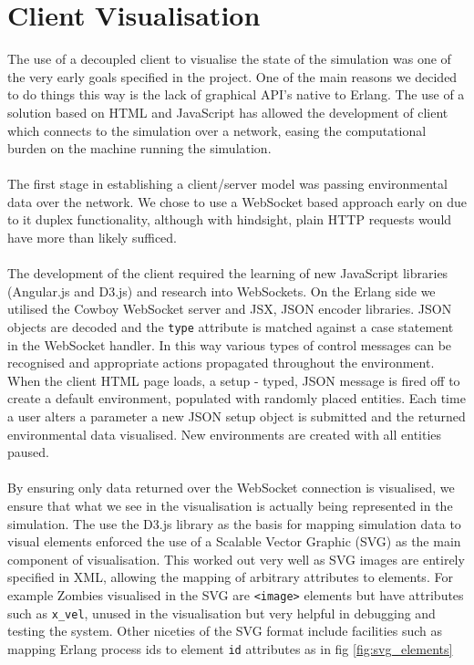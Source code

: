 \documentclass[10pt, a4paper, conference, compsocconf]{IEEEtran}
\begin{document}
\section{Client Visualisation \label{client}}
\label{visualisation}
The use of a decoupled client to visualise the state of the simulation was one of the very early goals specified in the project. One of the main reasons we decided to do things this way is the lack of graphical API's native to Erlang. The use of a solution based on HTML and JavaScript has allowed the development of client which connects to the simulation over a network, easing the computational burden on the machine running the simulation.\\
\\
The first stage in establishing a client/server model was passing environmental data over the network. We chose to use a WebSocket based approach early on due to it duplex functionality, although with hindsight, plain HTTP requests would have more than likely sufficed.\\
\\
The development of the client required the learning of new JavaScript libraries (Angular.js and D3.js) and research into WebSockets. On the Erlang side we utilised the Cowboy WebSocket\cite{cowboy} server and JSX, JSON encoder libraries. JSON objects are decoded and the \verb+type+ attribute is matched against a case statement in the WebSocket handler. In this way various types of control messages can be recognised and appropriate actions propagated throughout the environment. When the client HTML page loads, a setup - typed, JSON message is fired off to create a default environment, populated with randomly placed entities. Each time a user alters a parameter a new JSON setup object is submitted and the returned environmental data visualised. New environments are created with all entities paused.\\
\\
By ensuring only data returned over the WebSocket connection is visualised, we ensure that what we see in the visualisation is actually being represented in the simulation. The use the D3.js library as the basis for mapping simulation data to visual elements enforced the use of a Scalable Vector Graphic (SVG) as the main component of visualisation. This worked out very well as SVG images are entirely specified in XML, allowing the mapping of arbitrary attributes to elements. For example Zombies visualised in the SVG are \verb+<image>+ elements but have attributes such as \verb+x_vel+, unused in the visualisation but very helpful in debugging and testing the system. Other niceties of the SVG format include facilities such as mapping Erlang process ids to element \verb+id+ attributes as in fig \ref{fig:svg_elements}
\end{document}
